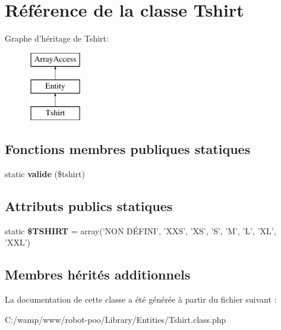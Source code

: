 \hypertarget{class_library_1_1_entities_1_1_tshirt}{\section{Référence de la classe Tshirt}
\label{class_library_1_1_entities_1_1_tshirt}
}
Graphe d'héritage de Tshirt\+:\begin{figure}[H]
\begin{center}
\leavevmode
\includegraphics[height=3.000000cm]{class_library_1_1_entities_1_1_tshirt}
\end{center}
\end{figure}
\subsection*{Fonctions membres publiques statiques}
\begin{DoxyCompactItemize}
\item 
\hypertarget{class_library_1_1_entities_1_1_tshirt_ab85ac904eb3845a5aebf4d271ea47fb2}{static {\bfseries valide} (\$tshirt)}\label{class_library_1_1_entities_1_1_tshirt_ab85ac904eb3845a5aebf4d271ea47fb2}

\end{DoxyCompactItemize}
\subsection*{Attributs publics statiques}
\begin{DoxyCompactItemize}
\item 
\hypertarget{class_library_1_1_entities_1_1_tshirt_ab3e30a86f369318db739205bd7be0333}{static {\bfseries \$\+T\+S\+H\+I\+R\+T} = array('N\+O\+N DÉ\+F\+I\+N\+I', 'X\+X\+S', 'X\+S', 'S', 'M', 'L', 'X\+L', 'X\+X\+L')}\label{class_library_1_1_entities_1_1_tshirt_ab3e30a86f369318db739205bd7be0333}

\end{DoxyCompactItemize}
\subsection*{Membres hérités additionnels}


La documentation de cette classe a été générée à partir du fichier suivant \+:\begin{DoxyCompactItemize}
\item 
C\+:/wamp/www/robot-\/poo/\+Library/\+Entities/Tshirt.\+class.\+php\end{DoxyCompactItemize}

